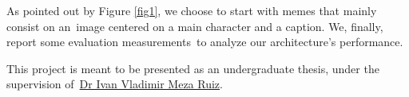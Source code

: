 \documentclass[paper=letter, fontsize=11pt]{scrartcl}
\begin{document}
As pointed out by Figure \ref{fig1}, we choose to start with memes that mainly consist on an\
image centered on a main character and a caption. We, finally, report some evaluation measurements\
to analyze our architecture's performance.\par
This project is meant to be presented as an undergraduate thesis, under the supervision of\
\href{http://turing.iimas.unam.mx/~ivanvladimir/}{Dr Ivan Vladimir Meza Ruiz}.


\printbibliography[title={Bibliography}]
\end{document}
